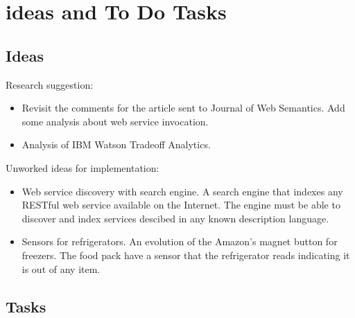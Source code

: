 \chapter{ideas and To Do Tasks}

\section{Ideas}
\label{sec:ideas}
Research suggestion:
\begin{itemize}
	\item Revisit the comments for the article sent to Journal of Web Semantics. Add some analysis about web service invocation.
	\item Analysis of IBM Watson Tradeoff Analytics.
\end{itemize}

Unworked ideas for implementation:
\begin{itemize}
  \item Web service discovery with search engine. A search engine that indexes any RESTful web service available on the Internet. The engine must be able to discover and index services descibed in any known description language.
  \item Sensors for refrigerators. An evolution of the Amazon's magnet button for freezers. The food pack have a sensor that the refrigerator reads indicating it is out of any item.
\end{itemize}

\section{Tasks}
\label{sec:tasks}